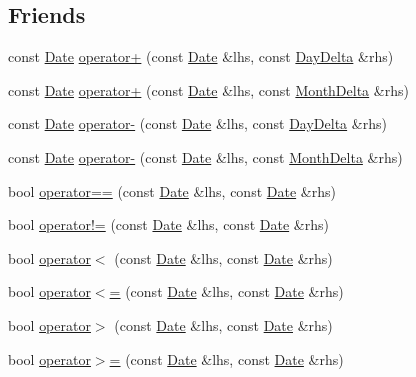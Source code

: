 \subsection*{\-Friends}
\begin{DoxyCompactItemize}
\item 
const \hyperlink{structDate}{\-Date} \hyperlink{structDate_a88a01e03ad6e96a22ee81ed7a38bdd5a}{operator+} (const \hyperlink{structDate}{\-Date} \&lhs, const \hyperlink{structDayDelta}{\-Day\-Delta} \&rhs)
\item 
const \hyperlink{structDate}{\-Date} \hyperlink{structDate_a0c895c337e87874cc232482d703db30e}{operator+} (const \hyperlink{structDate}{\-Date} \&lhs, const \hyperlink{structMonthDelta}{\-Month\-Delta} \&rhs)
\item 
const \hyperlink{structDate}{\-Date} \hyperlink{structDate_a10a73b5010e589b98f3929f9b36e2387}{operator-\/} (const \hyperlink{structDate}{\-Date} \&lhs, const \hyperlink{structDayDelta}{\-Day\-Delta} \&rhs)
\item 
const \hyperlink{structDate}{\-Date} \hyperlink{structDate_a61933f732562f4d15602110136ad536c}{operator-\/} (const \hyperlink{structDate}{\-Date} \&lhs, const \hyperlink{structMonthDelta}{\-Month\-Delta} \&rhs)
\item 
bool \hyperlink{structDate_a27425be265a0cc57e4f731825154ec4d}{operator==} (const \hyperlink{structDate}{\-Date} \&lhs, const \hyperlink{structDate}{\-Date} \&rhs)
\item 
bool \hyperlink{structDate_ad12683e4457513f4f834e13c4e7f72f8}{operator!=} (const \hyperlink{structDate}{\-Date} \&lhs, const \hyperlink{structDate}{\-Date} \&rhs)
\item 
bool \hyperlink{structDate_a611ba98c72bec2ae82bbf086b81563ef}{operator$<$} (const \hyperlink{structDate}{\-Date} \&lhs, const \hyperlink{structDate}{\-Date} \&rhs)
\item 
bool \hyperlink{structDate_acacb699d0fcffd2443c121586b7c22da}{operator$<$=} (const \hyperlink{structDate}{\-Date} \&lhs, const \hyperlink{structDate}{\-Date} \&rhs)
\item 
bool \hyperlink{structDate_a4e4faf476e7d66ef88aaca8b11a60175}{operator$>$} (const \hyperlink{structDate}{\-Date} \&lhs, const \hyperlink{structDate}{\-Date} \&rhs)
\item 
bool \hyperlink{structDate_aa72d3f6e17c7aab4d16e9e50b5069e1a}{operator$>$=} (const \hyperlink{structDate}{\-Date} \&lhs, const \hyperlink{structDate}{\-Date} \&rhs)
\end{DoxyCompactItemize}


